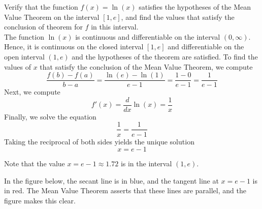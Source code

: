 \documentclass[handout]{ximera}
\begin{document}
\begin{example}[example 6]
Verify that the function $f(x) = \ln(x)$ satisfies the hypotheses of the Mean Value Theorem
on the interval $[1,e]$, and find the values that satisfy the conclusion of theorem for $f$ in this interval.\\
The function $\ln(x)$ is continuous and differentiable on the interval $(0, \infty)$. 
Hence, it is continuous on the closed interval $[1, e]$ and differentiable on the open interval $(1, e)$ and the hypotheses of the theorem are satisfied.
To find the values of $x$ that satisfy the conclusion of the Mean Value Theorem, we compute
\[
\frac{f(b) - f(a)}{b-a} = \frac{\ln(e) - \ln(1)}{e-1} = \frac{1 - 0}{e-1} = \frac{1}{e-1}
\]
Next, we compute
\[f'(x) = \frac{d}{dx} \ln(x) = \frac{1}{x}\]
Finally, we solve the equation
\[\frac{1}{x} = \frac{1}{e-1}\]
Taking the reciprocal of both sides yields the unique solution
\[ x = e-1\]

Note that the value $x = e-1\approx 1.72$ is in the interval $(1,e)$.

In the figure below, the secant line is in blue, 
and the tangent line at $x = e-1$ is in red. 
The Mean Value Theorem asserts that these lines are parallel, and the figure
makes this clear.

\begin{image}
\end{image}


\end{example}
\end{document}
